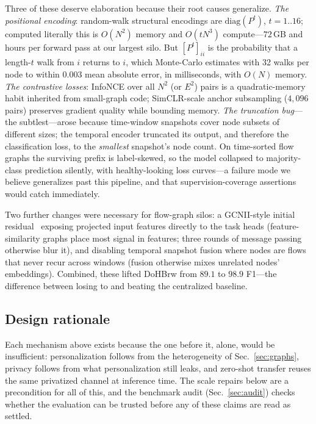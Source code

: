 \documentclass[journal]{IEEEtran}
\begin{document}
Three of these deserve elaboration because their root causes
generalize. \emph{The positional encoding}: random-walk structural
encodings are $\mathrm{diag}(P^{t})$, $t{=}1..16$; computed literally
this is $O(N^{2})$ memory and $O(tN^{3})$ compute---$72$\,GB and hours
per forward pass at our largest silo. But $[P^{t}]_{ii}$ is the
probability that a length-$t$ walk from $i$ returns to $i$, which
Monte-Carlo estimates with 32 walks per node to within $0.003$ mean
absolute error, in milliseconds, with $O(N)$ memory.
\emph{The contrastive losses}: InfoNCE over all $N^{2}$ (or $E^{2}$)
pairs is a quadratic-memory habit inherited from small-graph code;
SimCLR-scale anchor subsampling ($4{,}096$ pairs) preserves gradient
quality while bounding memory. \emph{The truncation bug}---the
subtlest---arose because time-window snapshots cover node subsets of
different sizes; the temporal encoder truncated its output, and
therefore the classification loss, to the \emph{smallest} snapshot's
node count. On time-sorted flow graphs the surviving prefix is
label-skewed, so the model collapsed to majority-class prediction
silently, with healthy-looking loss curves---a failure mode we believe
generalizes past this pipeline, and that supervision-coverage
assertions would catch immediately.

Two further changes were necessary for flow-graph silos: a GCNII-style
initial residual~\cite{gcnii} exposing projected input features
directly to the task heads (feature-similarity graphs place most
signal in features; three rounds of message passing otherwise blur
it), and disabling temporal snapshot fusion where nodes are flows that
never recur across windows (fusion otherwise mixes unrelated nodes'
embeddings). Combined, these lifted DoHBrw from $89.1$ to $98.9$
F1---the difference between losing to and beating the centralized
baseline.

\subsection{Design rationale}
\label{sec:flow}
Each mechanism above exists because the one before it, alone, would be
insufficient: personalization follows from the heterogeneity of
Sec.~\ref{sec:graphs}, privacy follows from what personalization still
leaks, and zero-shot transfer reuses the same privatized channel at
inference time. The scale repairs below are a precondition for all of
this, and the benchmark audit (Sec.~\ref{sec:audit}) checks whether the
evaluation can be trusted before any of these claims are read as
settled.
\end{document}

